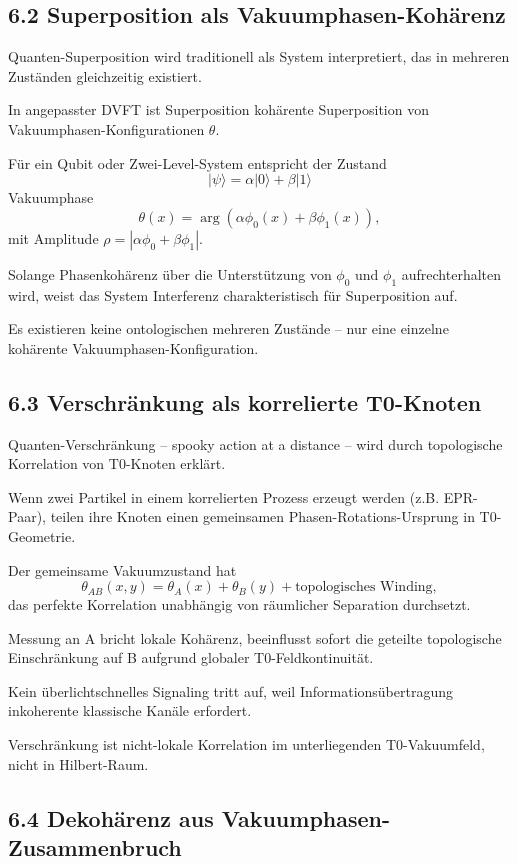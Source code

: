 	\subsection{6.2 Superposition als Vakuumphasen-Kohärenz}
	
	Quanten-Superposition wird traditionell als System interpretiert, das in mehreren Zuständen gleichzeitig existiert.
	
	In angepasster DVFT ist Superposition kohärente Superposition von Vakuumphasen-Konfigurationen $\theta$.
	
	Für ein Qubit oder Zwei-Level-System entspricht der Zustand
	\[
	|\psi\rangle = \alpha |0\rangle + \beta |1\rangle
	\]
	Vakuumphase
	\[
	\theta(x) = \arg(\alpha \phi_0(x) + \beta \phi_1(x)),
	\]
	mit Amplitude $\rho = |\alpha \phi_0 + \beta \phi_1|$.
	
	Solange Phasenkohärenz über die Unterstützung von $\phi_0$ und $\phi_1$ aufrechterhalten wird, weist das System Interferenz charakteristisch für Superposition auf.
	
	Es existieren keine ontologischen mehreren Zustände – nur eine einzelne kohärente Vakuumphasen-Konfiguration.
	
	\subsection{6.3 Verschränkung als korrelierte T0-Knoten}
	
	Quanten-Verschränkung – spooky action at a distance – wird durch topologische Korrelation von T0-Knoten erklärt.
	
	Wenn zwei Partikel in einem korrelierten Prozess erzeugt werden (z.B. EPR-Paar), teilen ihre Knoten einen gemeinsamen Phasen-Rotations-Ursprung in T0-Geometrie.
	
	Der gemeinsame Vakuumzustand hat
	\[
	\theta_{AB}(x,y) = \theta_A(x) + \theta_B(y) + \text{topologisches Winding},
	\]
	das perfekte Korrelation unabhängig von räumlicher Separation durchsetzt.
	
	Messung an A bricht lokale Kohärenz, beeinflusst sofort die geteilte topologische Einschränkung auf B aufgrund globaler T0-Feldkontinuität.
	
	Kein überlichtschnelles Signaling tritt auf, weil Informationsübertragung inkoherente klassische Kanäle erfordert.
	
	Verschränkung ist nicht-lokale Korrelation im unterliegenden T0-Vakuumfeld, nicht in Hilbert-Raum.
	
	\subsection{6.4 Dekohärenz aus Vakuumphasen-Zusammenbruch}
	
